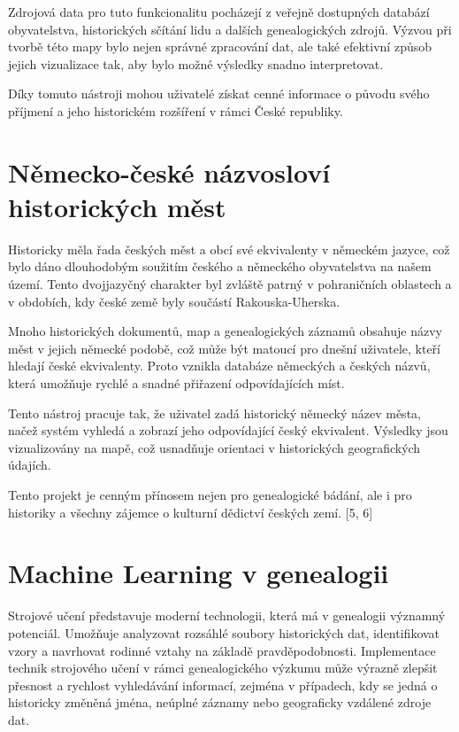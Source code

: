 \documentclass[czech, ba, kiv, he]{fasthesis}
\begin{document}
Zdrojová data pro tuto funkcionalitu pocházejí z veřejně dostupných databází obyvatelstva, historických sčítání lidu a dalších genealogických zdrojů. Výzvou při tvorbě této mapy bylo nejen správné zpracování dat, ale také efektivní způsob jejich vizualizace tak, aby bylo možné výsledky snadno interpretovat.

Díky tomuto nástroji mohou uživatelé získat cenné informace o původu svého příjmení a jeho historickém rozšíření v rámci České republiky.




\section{Německo-české názvosloví historických měst}

Historicky měla řada českých měst a obcí své ekvivalenty v německém jazyce, což bylo dáno dlouhodobým soužitím českého a německého obyvatelstva na našem území. Tento dvojjazyčný charakter byl zvláště patrný v pohraničních oblastech a v obdobích, kdy české země byly součástí Rakouska-Uherska.

Mnoho historických dokumentů, map a genealogických záznamů obsahuje názvy měst v jejich německé podobě, což může být matoucí pro dnešní uživatele, kteří hledají české ekvivalenty. Proto vznikla databáze německých a českých názvů, která umožňuje rychlé a snadné přiřazení odpovídajících míst.

Tento nástroj pracuje tak, že uživatel zadá historický německý název města, načež systém vyhledá a zobrazí jeho odpovídající český ekvivalent. Výsledky jsou vizualizovány na mapě, což usnadňuje orientaci v historických geografických údajích.

Tento projekt je cenným přínosem nejen pro genealogické bádání, ale i pro historiky a všechny zájemce o kulturní dědictví českých zemí. [5, 6]


\section{Machine Learning v genealogii}  

Strojové učení představuje moderní technologii, která má v genealogii významný potenciál. Umožňuje analyzovat rozsáhlé soubory historických dat, identifikovat vzory a navrhovat rodinné vztahy na základě pravděpodobnosti. Implementace technik strojového učení v rámci genealogického výzkumu může výrazně zlepšit přesnost a rychlost vyhledávání informací, zejména v případech, kdy se jedná o historicky změněná jména, neúplné záznamy nebo geograficky vzdálené zdroje dat.  
\end{document}
